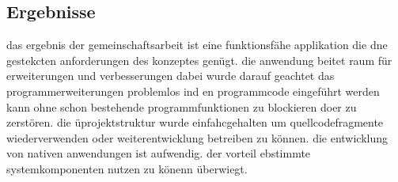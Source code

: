 \subsection{Ergebnisse}
das ergebnis der gemeinschaftsarbeit ist eine funktionsfähe applikation die dne gestekcten anforderungen des konzeptes genügt. die anwendung beitet raum für erweiterungen und verbesserungen dabei wurde darauf geachtet das programmerweiterungen problemlos ind en programmcode eingeführt werden kann ohne schon bestehende programmfunktionen zu blockieren doer zu zerstören.
die üprojektstruktur wurde einfahcgehalten um quellcodefragmente wiederverwenden oder weiterentwicklung betreiben zu können. die entwicklung von nativen anwendungen ist aufwendig. der vorteil ebstimmte systemkomponenten nutzen zu könenn überwiegt.